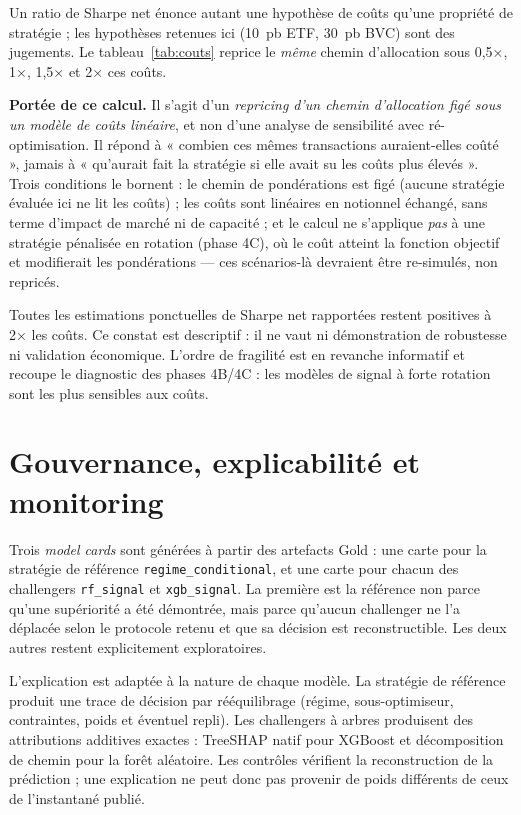 Un ratio de Sharpe net énonce autant une hypothèse de coûts qu'une propriété de
stratégie ; les hypothèses retenues ici (10~pb ETF, 30~pb BVC) sont des
jugements. Le tableau~\ref{tab:couts} reprice le \emph{même} chemin d'allocation
sous 0,5×, 1×, 1,5× et 2× ces coûts.



\textbf{Portée de ce calcul.} Il s'agit d'un \emph{repricing d'un chemin
d'allocation figé sous un modèle de coûts linéaire}, et non d'une analyse de
sensibilité avec ré-optimisation. Il répond à « combien ces mêmes transactions
auraient-elles coûté », jamais à « qu'aurait fait la stratégie si elle avait su
les coûts plus élevés ». Trois conditions le bornent : le chemin de pondérations
est figé (aucune stratégie évaluée ici ne lit les coûts) ; les coûts sont
linéaires en notionnel échangé, sans terme d'impact de marché ni de capacité ;
et le calcul ne s'applique \emph{pas} à une stratégie pénalisée en rotation
(phase 4C), où le coût atteint la fonction objectif et modifierait les
pondérations — ces scénarios-là devraient être re-simulés, non repricés.

Toutes les estimations ponctuelles de Sharpe net rapportées restent positives à
2× les coûts. Ce constat est descriptif : il ne vaut ni démonstration de
robustesse ni validation économique. L'ordre de fragilité est en revanche
informatif et recoupe le diagnostic des phases 4B/4C : les modèles de signal à
forte rotation sont les plus sensibles aux coûts.

\section{Gouvernance, explicabilité et monitoring}

Trois \emph{model cards} sont générées à partir des artefacts Gold : une carte
pour la stratégie de référence \texttt{regime\_conditional}, et une carte pour
chacun des challengers \texttt{rf\_signal} et \texttt{xgb\_signal}. La première
est la référence non parce qu'une supériorité a été démontrée, mais parce qu'aucun
challenger ne l'a déplacée selon le protocole retenu et que sa décision est
reconstructible. Les deux autres restent explicitement exploratoires.

L'explication est adaptée à la nature de chaque modèle. La stratégie de référence
produit une trace de décision par rééquilibrage (régime, sous-optimiseur,
contraintes, poids et éventuel repli). Les challengers à arbres produisent des
attributions additives exactes : TreeSHAP natif pour XGBoost et décomposition de
chemin pour la forêt aléatoire. Les contrôles vérifient la reconstruction de la
prédiction ; une explication ne peut donc pas provenir de poids différents de
ceux de l'instantané publié.

